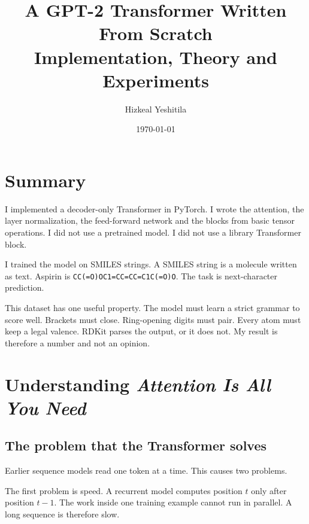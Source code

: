 \documentclass[11pt,a4paper]{article}
\title{\textbf{A GPT-2 Transformer Written From Scratch}\\[0.3em]
\large Implementation, Theory and Experiments}
\author{Hizkeal Yeshitila}
\date{\today}
\newcommand{\code}[1]{\texttt{#1}}
\begin{document}
\maketitle

\noindent{}

\vspace{1em}

\section*{Summary}

I implemented a decoder-only Transformer in PyTorch. I wrote the attention, the layer
normalization, the feed-forward network and the blocks from basic tensor operations. I did not
use a pretrained model. I did not use a library Transformer block.

I trained the model on SMILES strings. A SMILES string is a molecule written as text. Aspirin is
\code{CC(=O)OC1=CC=CC=C1C(=O)O}. The task is next-character prediction.

This dataset has one useful property. The model must learn a strict grammar to score well.
Brackets must close. Ring-opening digits must pair. Every atom must keep a legal valence. RDKit
parses the output, or it does not. My result is therefore a number and not an opinion.

\tableofcontents

\newpage

\section{Understanding \emph{Attention Is All You Need}}

\subsection{The problem that the Transformer solves}

Earlier sequence models read one token at a time. This causes two problems.

The first problem is speed. A recurrent model computes position $t$ only after position $t-1$.
The work inside one training example cannot run in parallel. A long sequence is therefore slow.
\end{document}
